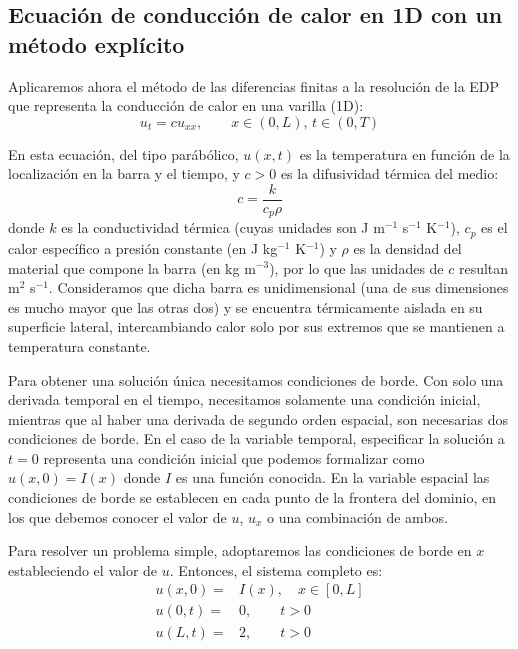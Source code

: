 \subsection{Ecuación de conducción de calor en 1D con un método explícito} \label{subsec:calor_explicito}
Aplicaremos ahora el método de las diferencias finitas a la resolución de la EDP que representa la conducción de calor en una varilla (1D):
\begin{equation}\label{eq:calor1}
 u_t = c u_{xx}, \qquad x \in (0, L), \, t \in  (0, T)
\end{equation} 

En esta ecuación, del tipo parábólico, $u(x,t)$ es la temperatura en función de la localización en la barra y el tiempo, y $c >0$ es la difusividad térmica del medio:
\[c = \frac{k}{c_p \rho}\]
donde $k$ es la conductividad térmica (cuyas unidades son J m$^{-1}$ s$^{-1}$ K$^{-1}$), $c_p$ es el calor específico a presión constante (en J kg$^{-1}$ K$^{-1}$) y $\rho$ es la densidad del material que compone la barra (en kg m$^{-3}$), por lo que las unidades de $c$ resultan m$^{2}$ s$^{-1}$. Consideramos que dicha barra es unidimensional (una de sus dimensiones es mucho mayor que las otras dos) y se encuentra térmicamente aislada en su superficie lateral, intercambiando calor solo por sus extremos que se mantienen a temperatura constante.

Para obtener una solución única necesitamos condiciones de borde. Con solo una derivada temporal en el tiempo, necesitamos solamente una condición inicial, mientras que al haber una derivada de segundo orden espacial, son necesarias dos condiciones de borde. En el caso de la variable temporal, especificar la solución a $t=0$ representa una condición inicial que podemos formalizar como $u(x,0) = I(x)$ donde $I$ es una función conocida. En la variable espacial las condiciones de borde se establecen en cada punto de la frontera del dominio, en los que debemos conocer el valor de $u$, $u_x$ o una combinación de ambos.

Para resolver un problema simple, adoptaremos las condiciones de borde en $x$ estableciendo el valor de $u$. Entonces, el sistema completo es:
\begin{align} 
 u(x,0) =& I(x), \quad x \in [0, L] \label{eq:bordet0}\\
 u(0, t) =& 0, \qquad t > 0 \label{eq:bordex0}\\
 u(L, t) =& 2, \qquad t > 0 \label{eq:bordex1}
\end{align}

